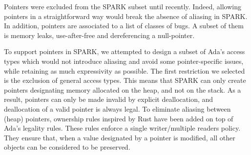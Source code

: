 \documentclass[runningheads]{llncs}
\begin{document}
Pointers were excluded from the SPARK subset until recently. Indeed, allowing pointers in a straightforward way would break the absence of aliasing in SPARK. In addition, pointers are associated to a list of classes of bugs. A subset of them is memory leaks, use-after-free and dereferencing a null-pointer.%

To support pointers in SPARK, we attempted to design a subset of Ada's access types which would not introduce aliasing and avoid some pointer-specific issues, while retaining as much expressivity as possible. The first restriction we selected is the exclusion of general access types. This means that SPARK can only create pointers designating memory allocated on the heap, and not on the stack. As a result, pointers can only be made invalid by explicit deallocation, and deallocation of a valid pointer is always legal.%
To eliminate aliasing between (heap) pointers, ownership rules inspired by Rust have been added on top of Ada's legality rules. These rules enforce a single writer/multiple readers policy. They ensure that, when a value designated by a pointer is modified, all other objects can be considered to be preserved.
\end{document}
